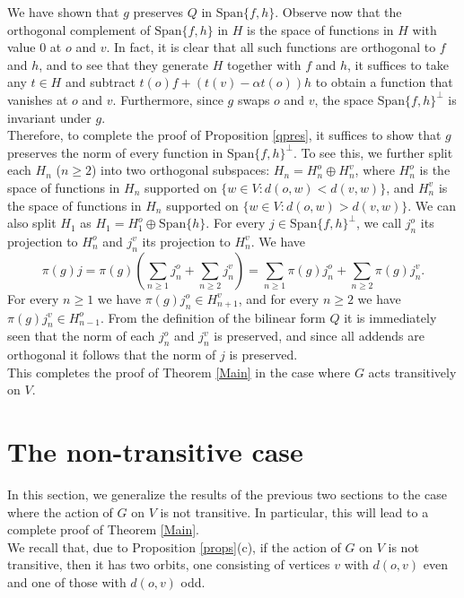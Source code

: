 \documentclass{article}
\theoremstyle{definition}
\theoremstyle{remark}
\theoremstyle{plain}
\begin{document}
We have shown that $g$ preserves $Q$ in $\mathrm{Span}\{f,h\}$. Observe now that the orthogonal complement of $\mathrm{Span}\{f,h\}$ in $H$ is the space of functions in $H$ with value $0$ at $o$ and $v$. In fact, it is clear that all such functions are orthogonal to $f$ and $h$, and to see that they generate $H$ together with $f$ and $h$, it suffices to take any $t\in H$ and subtract $t(o)f+(t(v)-\alpha t(o))h$ to obtain a function that vanishes at $o$ and $v$. Furthermore, since $g$ swaps $o$ and $v$, the space $\mathrm{Span}\{f,h\}^\perp$ is invariant under $g$. \\

Therefore, to complete the proof of Proposition \ref{qpres}, it suffices to show that $g$ preserves the norm of every function in $\mathrm{Span}\{f,h\}^\perp$. To see this, we further split each $H_n$ ($n\geq 2$) into two orthogonal subspaces: $H_n=H_n^o\oplus H_n^v$, where $H_n^o$ is the space of functions in $H_n$ supported on $\{w\in V: d(o,w)<d(v,w)\}$, and $H_n^v$ is the space of functions in $H_n$ supported on $\{w\in V: d(o,w)>d(v,w)\}$. We can also split $H_1$ as $H_1=H_1^o\oplus\mathrm{Span}\{h\}$. For every $j\in\mathrm{Span}\{f,h\}^\perp$, we call $j_n^o$ its projection to $H_n^o$ and $j_n^v$ its projection to $H_n^v$. We have $$\pi(g)j=\pi(g)\left(\sum_{n\geq 1}{j_n^o}+\sum_{n\geq 2}{j_n^v}\right)=\sum_{n\geq 1}{\pi(g)j_n^o}+\sum_{n\geq 2}{\pi(g)j_n^v}.$$ For every $n\geq 1$ we have $\pi(g)j_n^o\in H_{n+1}^v$, and for every $n\geq 2$ we have $\pi(g)j_n^v\in H_{n-1}^o$. From the definition of the bilinear form $Q$ it is immediately seen that the norm of each $j_n^o$ and $j_n^v$ is preserved, and since all addends are orthogonal it follows that the norm of $j$ is preserved. \\

This completes the proof of Theorem \ref{Main} in the case where $G$ acts transitively on $V$. \\

\section{The non-transitive case}

In this section, we generalize the results of the previous two sections to the case where the action of $G$ on $V$ is not transitive. In particular, this will lead to a complete proof of Theorem \ref{Main}. \\

We recall that, due to Proposition \ref{props}(c), if the action of $G$ on $V$ is not transitive, then it has two orbits, one consisting of vertices $v$ with $d(o,v)$ even and one of those with $d(o,v)$ odd. \\
\end{document}
